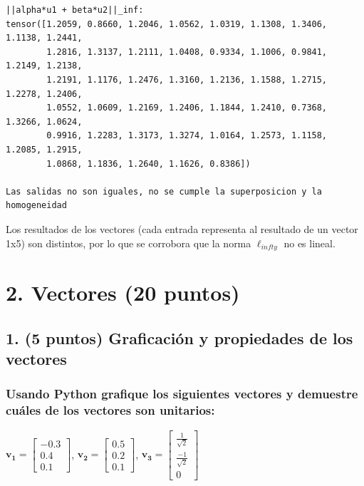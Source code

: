 \documentclass[12 pt]{article}
\begin{document}
\begin{enumerate}
\begin{lstlisting}
||alpha*u1 + beta*u2||_inf: 
tensor([1.2059, 0.8660, 1.2046, 1.0562, 1.0319, 1.1308, 1.3406, 1.1138, 1.2441,
        1.2816, 1.3137, 1.2111, 1.0408, 0.9334, 1.1006, 0.9841, 1.2149, 1.2138,
        1.2191, 1.1176, 1.2476, 1.3160, 1.2136, 1.1588, 1.2715, 1.2278, 1.2406,
        1.0552, 1.0609, 1.2169, 1.2406, 1.1844, 1.2410, 0.7368, 1.3266, 1.0624,
        0.9916, 1.2283, 1.3173, 1.3274, 1.0164, 1.2573, 1.1158, 1.2085, 1.2915,
        1.0868, 1.1836, 1.2640, 1.1626, 0.8386])

Las salidas no son iguales, no se cumple la superposicion y la homogeneidad
\end{lstlisting}

Los resultados de los vectores (cada entrada representa al resultado de un vector 1x5) son distintos, por lo que se corrobora que la norma ${\ell_{infty}}$ no es lineal.
    
\end{enumerate}

\section*{2. Vectores (20 puntos)}

\subsection*{1. (5 puntos) Graficación y propiedades de los vectores}

\subsubsection*{Usando Python grafique los siguientes vectores y demuestre cuáles de los vectores son unitarios:}

\begin{center}
    $\mathbf{v_1} = \begin{bmatrix} -0.3 \\ 0.4 \\ 0.1 \end{bmatrix}$, $\mathbf{v_2} = \begin{bmatrix} 0.5 \\ 0.2 \\ 0.1 \end{bmatrix}$, $\mathbf{v_3} = \begin{bmatrix} \frac{1}{\sqrt{2}} \\ \frac{-1}{\sqrt{2}} \\ 0 \end{bmatrix}$
\end{center}
\end{document}
